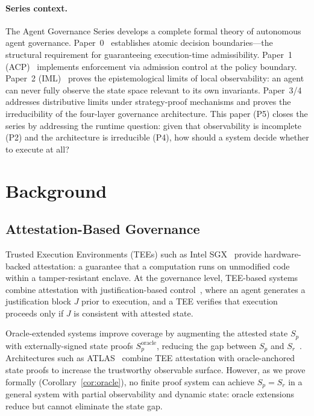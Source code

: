 \documentclass[11pt]{article}
\newcommand{\Sr}{S_r}
\newcommand{\Sp}{S_p}
\begin{document}
\paragraph{Series context.}
The Agent Governance Series develops a complete formal theory of autonomous
agent governance.
Paper~0~\cite{fernandez2026a} establishes atomic decision boundaries---the
structural requirement for guaranteeing execution-time admissibility.
Paper~1 (ACP)~\cite{fernandez2026b} implements enforcement via admission control
at the policy boundary.
Paper~2 (IML)~\cite{fernandez2026c} proves the epistemological limits of local
observability: an agent can never fully observe the state space relevant to its
own invariants.
Paper~3/4~\cite{fernandez2026govstr} addresses distributive limits under strategy-proof
mechanisms and proves the irreducibility of the four-layer governance architecture.
This paper (P5) closes the series by addressing the runtime question: given
that observability is incomplete (P2) and the architecture is irreducible (P4),
how should a system decide whether to execute at all?

\section{Background}
\label{sec:background}

\subsection{Attestation-Based Governance}

Trusted Execution Environments (TEEs) such as Intel SGX~\cite{costan2016intel}
provide hardware-backed attestation: a guarantee that a computation runs on
unmodified code within a tamper-resistant enclave.
At the governance level, TEE-based systems combine attestation with
justification-based control~\cite{gu2017certikos}, where an agent generates a
justification block $J$ prior to execution, and a TEE verifies that execution
proceeds only if $J$ is consistent with attested state.

Oracle-extended systems improve coverage by augmenting the attested state $\Sp$
with externally-signed state proofs $\Sp^{\text{oracle}}$, reducing the gap
between $\Sp$ and $\Sr$~\cite{adler2018astraea}.
Architectures such as ATLAS~\cite{zhang2020deco} combine TEE attestation with
oracle-anchored state proofs to increase the trustworthy observable surface.
However, as we prove formally (Corollary~\ref{cor:oracle}), no finite proof
system can achieve $\Sp = \Sr$ in a general system with partial observability
and dynamic state: oracle extensions reduce but cannot eliminate the state gap.
\end{document}
